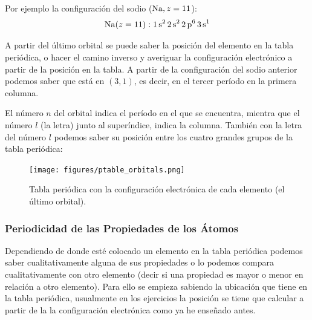 \documentclass[arial,a4paper,print]{article}
\begin{document}
Por ejemplo la configuración del sodio ($\ce{Na}, z=11$):
\begin{equation*}
	\ce{Na} (z=11): \ce{1s^{2} 2s^{2} 2p^{6} 3s^1}
\end{equation*}

A partir del último orbital se puede saber la posición del elemento en la tabla periódica, o hacer el camino inverso y averiguar la configuración electrónico a partir de la posición en la tabla. A partir de la configuración del sodio anterior podemos saber que está en $(3,1)$, es decir, en el tercer período en la primera columna. 

El número $n$ del orbital indica el período en el que se encuentra, mientra que el número $l$ (la letra) junto al superíndice, indica la columna. También con la letra del número $l$ podemos saber su posición entre los cuatro grandes grupos de la tabla periódica:
\begin{figure}[H]
	\centering
	\texttt{[image: figures/ptable\_orbitals.png]}
	\caption{Tabla periódica con la configuración electrónica de cada elemento (el último orbital). }
	\label{fig:ptableorbitalspng}
\end{figure}

\subsubsection{Periodicidad de las Propiedades de los Átomos}
Dependiendo de donde esté colocado un elemento en la tabla periódica podemos saber cualitativamente alguna de sus propiedades o lo podemos compara cualitativamente con otro elemento (decir si una propiedad es mayor o menor en relación a otro elemento). Para ello se empieza sabiendo la ubicación que tiene en la tabla periódica, usualmente en los ejercicios la posición se tiene que calcular a partir de la la configuración electrónica como ya he enseñado antes.  
\end{document}
